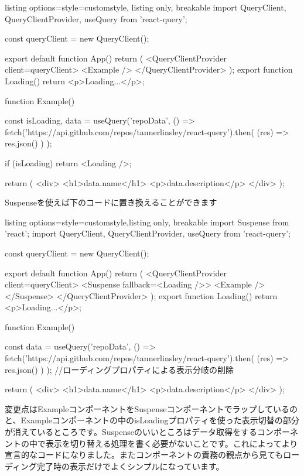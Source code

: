 \begin{tcblisting}{listing options={style=customstyle}, listing only, breakable}
  import { QueryClient, QueryClientProvider, useQuery } from 'react-query';

  const queryClient = new QueryClient();

  export default function App() {
  return (
  <QueryClientProvider client={queryClient}>
  <Example />
  </QueryClientProvider>
  );
  }
  export function Loading() {
      return <p>Loading...</p>;
    }

  function Example() {
      const { isLoading, data } = useQuery('repoData', () =>
      fetch('https://api.github.com/repos/tannerlinsley/react-query').then(
      (res) => res.json()
      )
      );

      if (isLoading) return <Loading />;

      return (
      <div>
        <h1>{data.name}</h1>
        <p>{data.description}</p>
      </div>
      );
    }
\end{tcblisting}




Suspenseを使えば下のコードに置き換えることができます


\begin{tcblisting}{listing options={style=customstyle},listing only, breakable}
  import { Suspense } from 'react';
  import { QueryClient, QueryClientProvider, useQuery } from 'react-query';

  const queryClient = new QueryClient();

  export default function App() {
  return (
  <QueryClientProvider client={queryClient}>
  <Suspense fallback={<Loading />}>
  <Example />
  </Suspense>
  </QueryClientProvider>
  );
  }
  export function Loading() {
      return <p>Loading...</p>;
    }

  function Example() {
      const { data } = useQuery('repoData', () =>
      fetch('https://api.github.com/repos/tannerlinsley/react-query').then(
      (res) => res.json()
      )
      );
      //ローディングプロパティによる表示分岐の削除

      return (
      <div>
        <h1>{data.name}</h1>
        <p>{data.description}</p>
      </div>
      );
    }
\end{tcblisting}





変更点はExampleコンポーネントをSuspenseコンポーネントでラップしているのと、Exampleコンポーネントの中のisLoadingプロパティを使った表示切替の部分が消えているところです。Suspenseのいいところはデータ取得をするコンポーネントの中で表示を切り替える処理を書く必要がないことです。これによってより宣言的なコードになりました。またコンポーネントの責務の観点から見てもローディング完了時の表示だけでよくシンプルになっています。

